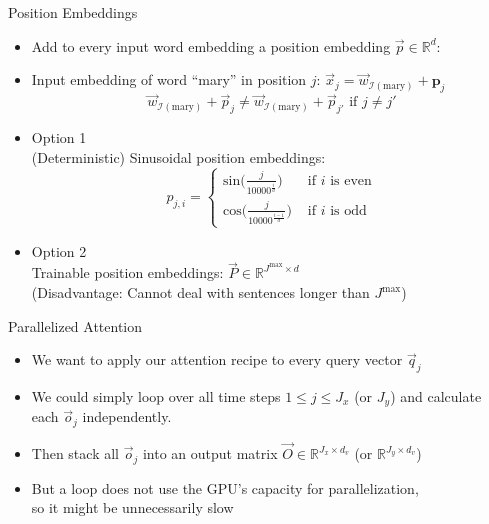 \begin{vbframe}{Position Embeddings}

\vfill

\begin{itemize}
\item Add to every input word embedding a position embedding $\vec {p} \in \mathbb{R}^d$:
\item Input embedding of word ``mary'' in position $j$: $\vec {x}_j = \vec {w}_{\mathcal{I}(\text{mary})} + \mathbf{p}_j$
$$\vec {w}_{\mathcal{I}(\text{mary})} + \vec {p}_j \neq \vec{w}_{\mathcal{I}(\text{mary})} + \vec {p}_{j'} \text{ if } j \neq j'$$
\item Option 1 \\
(Deterministic) Sinusoidal position embeddings:
$$p_{j,i} = \begin{cases} \mathrm{sin}\big(\frac{j}{10000^\frac{i}{d}}\big)  & \text{ if } i \text{ is even} \\ \mathrm{cos}\big(\frac{j}{10000^\frac{i-1}{d}}\big) & \text{ if } i \text{ is odd}  \end{cases}$$
\item Option 2 \\
Trainable position embeddings: $\vec {P} \in \mathbb{R}^{J^\mathrm{max} \times d}$\\
(Disadvantage: Cannot deal with sentences longer than $J^\mathrm{max}$)
\end{itemize}

\vfill

\end{vbframe}

\begin{vbframe}{Parallelized Attention}

\vfill

\begin{itemize}
\item We want to apply our attention recipe to every query vector $\vec q_j$
\item We could simply loop over all time steps $1 \leq j \leq J_x$ (or $J_y$) and calculate each $\vec o_j$ independently.
\item Then stack all $\vec o_j$ into an output matrix $\vec O \in \mathbb{R}^{J_x \times d_v}$ (or $\mathbb{R}^{J_y \times d_v}$)
\item But a loop does not use the GPU's capacity for parallelization,\\ so it might be unnecessarily slow
\end{itemize}

\vfill

\end{vbframe}

